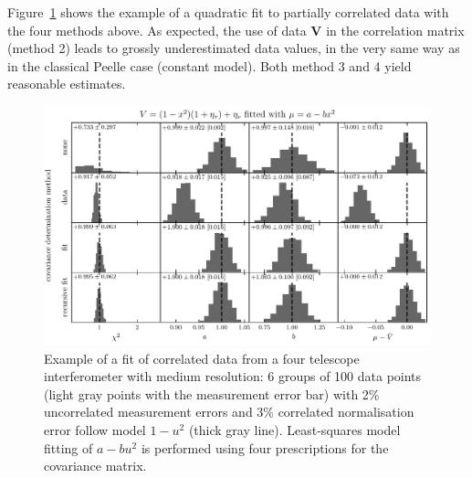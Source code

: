 \documentclass[twocolumn]{article}
\def\vec#1{\ensuremath{\boldsymbol{#1}}}
\def\data{\ensuremath{{\scriptstyle V}}}
\def\vdata{\ensuremath{\vec\data}}
\begin{document}
Figure~\ref{fig:fitexample} shows the example of a quadratic fit to partially correlated data with the four methods above.  As expected, the use of data $\vdata$ in the correlation matrix (method 2) leads to grossly underestimated data values, in the very same way as in the classical Peelle case (constant model).  Both method 3 and 4 yield reasonable estimates.

\begin{figure}
\centering
\includegraphics[width=\linewidth]{pdf/fit-example.pdf}
\caption{Example of a fit of correlated data from a four telescope interferometer with medium resolution: 6 groups of 100 data points (light gray points with the measurement error bar) with 2\% uncorrelated measurement errors and 3\% correlated normalisation error follow model $1-u^2$ (thick gray line). Least-squares model fitting of $a-bu^2$ is performed using four prescriptions for the covariance matrix.}
\label{fig:fitexample}
\end{figure}
\end{document}
